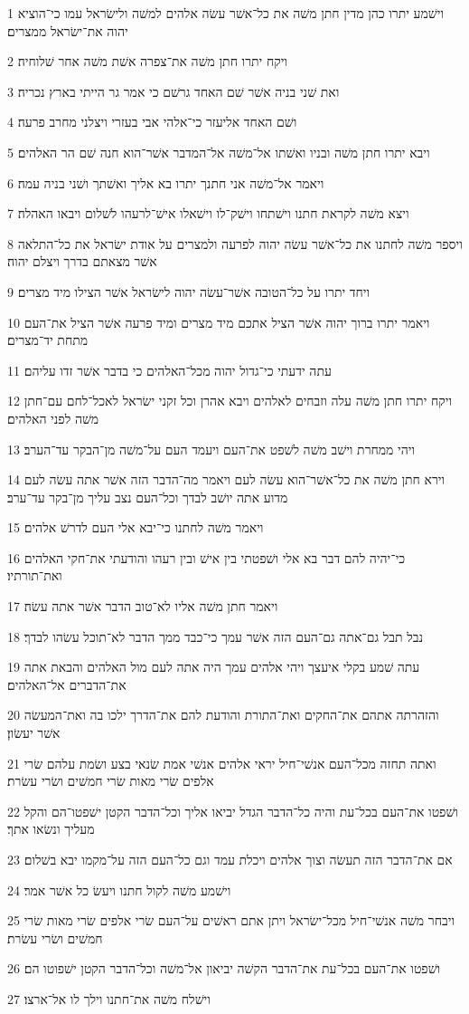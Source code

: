 \par 1 וישׁמע יתרו כהן מדין חתן משׁה את כל־אשׁר עשׂה אלהים למשׁה ולישׂראל עמו כי־הוציא יהוה את־ישׂראל ממצרים׃
\par 2 ויקח יתרו חתן משׁה את־צפרה אשׁת משׁה אחר שׁלוחיה׃
\par 3 ואת שׁני בניה אשׁר שׁם האחד גרשׁם כי אמר גר הייתי בארץ נכריה׃
\par 4 ושׁם האחד אליעזר כי־אלהי אבי בעזרי ויצלני מחרב פרעה׃
\par 5 ויבא יתרו חתן משׁה ובניו ואשׁתו אל־משׁה אל־המדבר אשׁר־הוא חנה שׁם הר האלהים׃
\par 6 ויאמר אל־משׁה אני חתנך יתרו בא אליך ואשׁתך ושׁני בניה עמה׃
\par 7 ויצא משׁה לקראת חתנו וישׁתחו וישׁק־לו וישׁאלו אישׁ־לרעהו לשׁלום ויבאו האהלה׃
\par 8 ויספר משׁה לחתנו את כל־אשׁר עשׂה יהוה לפרעה ולמצרים על אודת ישׂראל את כל־התלאה אשׁר מצאתם בדרך ויצלם יהוה׃
\par 9 ויחד יתרו על כל־הטובה אשׁר־עשׂה יהוה לישׂראל אשׁר הצילו מיד מצרים׃
\par 10 ויאמר יתרו ברוך יהוה אשׁר הציל אתכם מיד מצרים ומיד פרעה אשׁר הציל את־העם מתחת יד־מצרים׃
\par 11 עתה ידעתי כי־גדול יהוה מכל־האלהים כי בדבר אשׁר זדו עליהם׃
\par 12 ויקח יתרו חתן משׁה עלה וזבחים לאלהים ויבא אהרן וכל זקני ישׂראל לאכל־לחם עם־חתן משׁה לפני האלהים׃
\par 13 ויהי ממחרת וישׁב משׁה לשׁפט את־העם ויעמד העם על־משׁה מן־הבקר עד־הערב׃
\par 14 וירא חתן משׁה את כל־אשׁר־הוא עשׂה לעם ויאמר מה־הדבר הזה אשׁר אתה עשׂה לעם מדוע אתה יושׁב לבדך וכל־העם נצב עליך מן־בקר עד־ערב׃
\par 15 ויאמר משׁה לחתנו כי־יבא אלי העם לדרשׁ אלהים׃
\par 16 כי־יהיה להם דבר בא אלי ושׁפטתי בין אישׁ ובין רעהו והודעתי את־חקי האלהים ואת־תורתיו׃
\par 17 ויאמר חתן משׁה אליו לא־טוב הדבר אשׁר אתה עשׂה׃
\par 18 נבל תבל גם־אתה גם־העם הזה אשׁר עמך כי־כבד ממך הדבר לא־תוכל עשׂהו לבדך׃
\par 19 עתה שׁמע בקלי איעצך ויהי אלהים עמך היה אתה לעם מול האלהים והבאת אתה את־הדברים אל־האלהים׃
\par 20 והזהרתה אתהם את־החקים ואת־התורת והודעת להם את־הדרך ילכו בה ואת־המעשׂה אשׁר יעשׂון׃
\par 21 ואתה תחזה מכל־העם אנשׁי־חיל יראי אלהים אנשׁי אמת שׂנאי בצע ושׂמת עלהם שׂרי אלפים שׂרי מאות שׂרי חמשׁים ושׂרי עשׂרת׃
\par 22 ושׁפטו את־העם בכל־עת והיה כל־הדבר הגדל יביאו אליך וכל־הדבר הקטן ישׁפטו־הם והקל מעליך ונשׂאו אתך׃
\par 23 אם את־הדבר הזה תעשׂה וצוך אלהים ויכלת עמד וגם כל־העם הזה על־מקמו יבא בשׁלום׃
\par 24 וישׁמע משׁה לקול חתנו ויעשׂ כל אשׁר אמר׃
\par 25 ויבחר משׁה אנשׁי־חיל מכל־ישׂראל ויתן אתם ראשׁים על־העם שׂרי אלפים שׂרי מאות שׂרי חמשׁים ושׂרי עשׂרת׃
\par 26 ושׁפטו את־העם בכל־עת את־הדבר הקשׁה יביאון אל־משׁה וכל־הדבר הקטן ישׁפוטו הם׃
\par 27 וישׁלח משׁה את־חתנו וילך לו אל־ארצו׃

